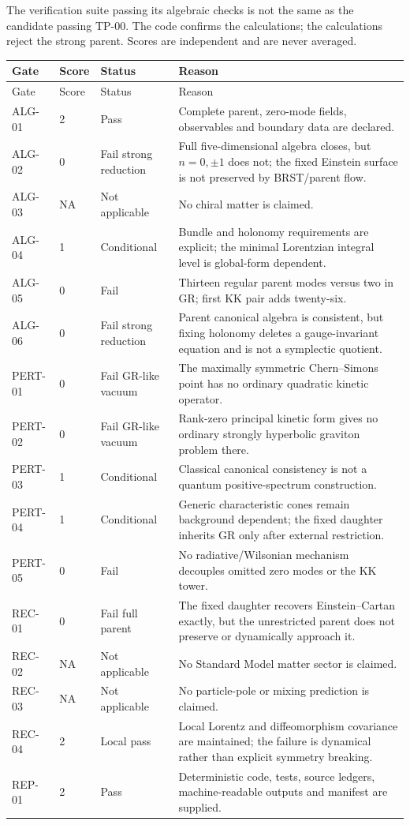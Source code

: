 The verification suite passing its algebraic checks is not the same as the candidate passing TP-00.  The code confirms the calculations; the calculations reject the strong parent.  Scores are independent and are never averaged.

\begin{longtable}{@{}p{}p{}p{}p{}@{}}
\toprule
Gate & Score & Status & Reason \\
\midrule
\endfirsthead
\toprule
Gate & Score & Status & Reason \\
\midrule
\endhead
ALG-01 & 2 & Pass & Complete parent, zero-mode fields, observables and boundary data are declared. \\
ALG-02 & 0 & Fail strong reduction & Full five-dimensional algebra closes, but $n=0,\pm1$ does not; the fixed Einstein surface is not preserved by BRST/parent flow. \\
ALG-03 & NA & Not applicable & No chiral matter is claimed. \\
ALG-04 & 1 & Conditional & Bundle and holonomy requirements are explicit; the minimal Lorentzian integral level is global-form dependent. \\
ALG-05 & 0 & Fail & Thirteen regular parent modes versus two in GR; first KK pair adds twenty-six. \\
ALG-06 & 0 & Fail strong reduction & Parent canonical algebra is consistent, but fixing holonomy deletes a gauge-invariant equation and is not a symplectic quotient. \\
PERT-01 & 0 & Fail GR-like vacuum & The maximally symmetric Chern--Simons point has no ordinary quadratic kinetic operator. \\
PERT-02 & 0 & Fail GR-like vacuum & Rank-zero principal kinetic form gives no ordinary strongly hyperbolic graviton problem there. \\
PERT-03 & 1 & Conditional & Classical canonical consistency is not a quantum positive-spectrum construction. \\
PERT-04 & 1 & Conditional & Generic characteristic cones remain background dependent; the fixed daughter inherits GR only after external restriction. \\
PERT-05 & 0 & Fail & No radiative/Wilsonian mechanism decouples omitted zero modes or the KK tower. \\
REC-01 & 0 & Fail full parent & The fixed daughter recovers Einstein--Cartan exactly, but the unrestricted parent does not preserve or dynamically approach it. \\
REC-02 & NA & Not applicable & No Standard Model matter sector is claimed. \\
REC-03 & NA & Not applicable & No particle-pole or mixing prediction is claimed. \\
REC-04 & 2 & Local pass & Local Lorentz and diffeomorphism covariance are maintained; the failure is dynamical rather than explicit symmetry breaking. \\
REP-01 & 2 & Pass & Deterministic code, tests, source ledgers, machine-readable outputs and manifest are supplied. \\
\bottomrule
\end{longtable}

